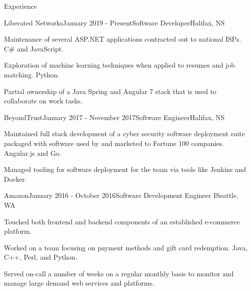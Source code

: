 \documentclass{resume} %
\begin{document}
\begin{rSection}{Experience}

\begin{rSubsection}{Liberated Networks}{January 2019 - Present}{Software Developer}{Halifax, NS}
\item Maintenance of several ASP.NET applications contracted out to national ISPs. C\# and JavaScript.
\item Exploration of machine learning techniques when applied to resumes and job matching. Python.
\item Partial ownership of a Java Spring and Angular 7 stack that is used to collaborate on work tasks.
\end{rSubsection}

\begin{rSubsection}{BeyondTrust}{January 2017 - November 2017}{Software Engineer}{Halifax, NS}
\item Maintained full stack development of a cyber security software deployment suite packaged with software used by and marketed to Fortune 100 companies. Angular.js and Go.
\item Managed tooling for software deployment for the team via tools like Jenkins and Docker.  
\end{rSubsection}


\begin{rSubsection}{Amazon}{January 2016 - October 2016}{Software Development Engineer I}{Seattle, WA}
\item Touched both frontend and backend components of an established e-commerce platform.
\item Worked on a team focusing on payment methods and gift card redemption. Java, C++, Perl, and Python.
\item Served on-call a number of weeks on a regular monthly basis to monitor and manage large demand web services and platforms.
\end{rSubsection}

\end{rSection}

\end{document}
